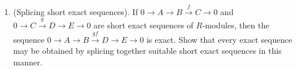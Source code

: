 \documentclass[12pt]{article}
\begin{document}
\begin{enumerate}
\item {\color{blue}(Splicing short exact sequences).}
  If $0\to A\to B\xrightarrow{f} C\to 0$ and $0\to C\xrightarrow{g} D\to E\to 0$  are short exact sequences of $R$-modules, then the
  sequence  $0\to A\to B\xrightarrow{gf}  D\to E\to 0$  is exact. \newline
  Show that every exact sequence may be obtained by splicing together suitable short exact sequences in this manner.
   \vspace{-2pt}


\end{enumerate}
\end{document}
